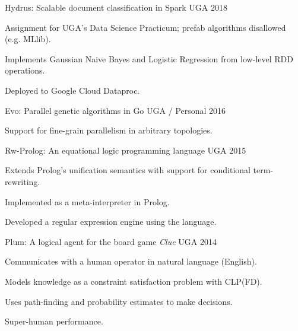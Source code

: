 \begin{cventries}

\cventry
{\textnormal{}}
{Hydrus: Scalable document classification in Spark}
{UGA}
{2018}
{\begin{cvitems}
    \item {Assignment for UGA's Data Science Practicum; prefab algorithms disallowed (e.g. MLlib).}
    \item {Implements Gaussian Naive Bayes and Logistic Regression from low-level RDD operations.}
    \item {Deployed to Google Cloud Dataproc.}
\end{cvitems}}

\cventry
{\textnormal{}}
{Evo: Parallel genetic algorithms in Go}
{UGA / Personal}
{2016}
{\begin{cvitems}
    \item {Support for fine-grain parallelism in arbitrary topologies.}
\end{cvitems}}

\cventry
{\textnormal{}}
{Rw-Prolog: An equational logic programming language}
{UGA}
{2015}
{\begin{cvitems}
    \item {Extends Prolog's unification semantics with support for conditional term-rewriting.}
    \item {Implemented as a meta-interpreter in Prolog.}
    \item {Developed a regular expression engine using the language.}
\end{cvitems}}

\cventry
{\textnormal{}}
{Plum: A logical agent for the board game \textit{Clue}}
{UGA}
{2014}
{\begin{cvitems}
    \item {Communicates with a human operator in natural language (English).}
    \item {Models knowledge as a constraint satisfaction problem with CLP(FD).}
    \item {Uses path-finding and probability estimates to make decisions.}
    \item {Super-human performance.}
\end{cvitems}}

\end{cventries}
